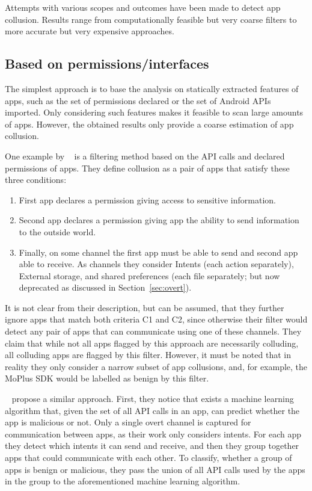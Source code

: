\documentclass[article]{aaltoseries}
\newcommand{\Sref}[1]{Section~\ref{#1}}
\begin{document}
Attempts with various scopes and outcomes have been made to detect app collusion. Results range from computationally feasible but very coarse filters to more accurate but very expensive approaches.

\subsection{Based on permissions/interfaces}
\label{sec:filter}

The simplest approach is to base the analysis on statically extracted features of apps, such as the set of permissions declared or the set of Android APIs imported. Only considering such features makes it feasible to scan large amounts of apps. However, the obtained results only provide a coarse estimation of app collusion.

One example by \citeauthor{Asavoae2016}~\cite{Asavoae2016} is a filtering method based on the API calls and declared permissions of apps. They define collusion as a pair of apps that satisfy these three conditions:
\begin{enumerate}[label={C\arabic*}]
	\item First app declares a permission giving access to sensitive information.
	\item Second app declares a permission giving app the ability to send information to the outside world.
	\item Finally, on some channel the first app must be able to send and second app able to receive. As channels they consider Intents (each action separately), External storage, and shared preferences (each file separately; but now deprecated as discussed in \Sref{sec:overt}).
\end{enumerate}
It is not clear from their description, but can be assumed, that they further ignore apps that match both criteria C1 and C2, since otherwise their filter would detect any pair of apps that can communicate using one of these channels. They claim that while not all apps flagged by this approach are necessarily colluding, all colluding apps are flagged by this filter. However, it must be noted that in reality they only consider a narrow subset of app collusions, and, for example, the MoPlus SDK would be labelled as benign by this filter.

\citeauthor{Chen2018}~\cite{Chen2018} propose a similar approach. First, they notice that exists a machine learning algorithm that, given the set of all API calls in an app, can predict whether the app is malicious or not. Only a single overt channel is captured for communication between apps, as their work only considers intents. For each app they detect which intents it can send and receive, and then they group together apps that could communicate with each other. To classify, whether a group of apps is benign or malicious, they pass the union of all API calls used by the apps in the group to the aforementioned machine learning algorithm.
\end{document}
